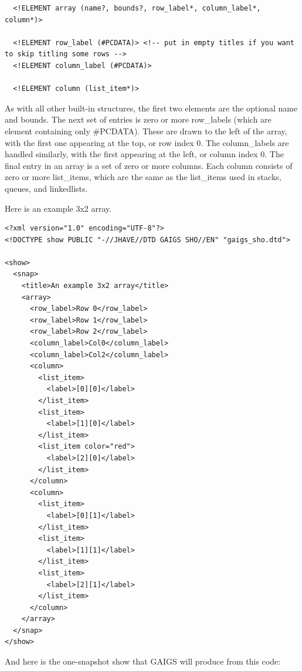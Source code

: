 \documentclass[12pt]{article}
\begin{document}
\footnotesize \begin{verbatim}
  <!ELEMENT array (name?, bounds?, row_label*, column_label*, column*)>

  <!ELEMENT row_label (#PCDATA)> <!-- put in empty titles if you want to skip titling some rows -->
  <!ELEMENT column_label (#PCDATA)>

  <!ELEMENT column (list_item*)>
\end{verbatim} \normalsize
  
  As with all other built-in structures, the first two elements are
  the optional name and bounds.  The next set of entries is zero or
  more row\_labels (which are element containing only \#PCDATA). These
  are drawn to the left of the array, with the first one appearing at
  the top, or row index 0. The column\_labels are handled similarly,
  with the first appearing at the left, or column index 0. The final
  entry in an array is a set of zero or more columns. Each column
  consists of zero or more list\_items, which are the same as the
  list\_items used in stacks, queues, and linkedlists.

Here is an example 3x2 array.

\footnotesize \begin{verbatim}
<?xml version="1.0" encoding="UTF-8"?>
<!DOCTYPE show PUBLIC "-//JHAVE//DTD GAIGS SHO//EN" "gaigs_sho.dtd">

<show>
  <snap>
    <title>An example 3x2 array</title>
    <array>
      <row_label>Row 0</row_label>
      <row_label>Row 1</row_label>
      <row_label>Row 2</row_label>
      <column_label>Col0</column_label>
      <column_label>Col2</column_label>
      <column>
        <list_item>
          <label>[0][0]</label>
        </list_item>
        <list_item>
          <label>[1][0]</label>
        </list_item>
        <list_item color="red">
          <label>[2][0]</label>
        </list_item>
      </column>
      <column>
        <list_item>
          <label>[0][1]</label>
        </list_item>
        <list_item>
          <label>[1][1]</label>
        </list_item>
        <list_item>
          <label>[2][1]</label>
        </list_item>
      </column>
    </array>
  </snap>
</show>
\end{verbatim} \normalsize

And here is the one-snapshot show that GAIGS will produce from this code:
\end{document}
